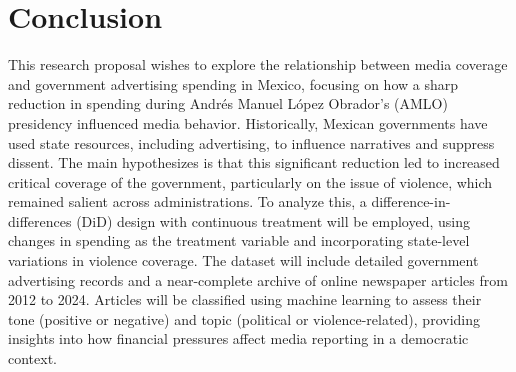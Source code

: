 \section{Conclusion}

This research proposal wishes to explore the relationship between media coverage and government advertising spending in Mexico, focusing on how a sharp reduction in spending during Andrés Manuel López Obrador's (AMLO) presidency influenced media behavior. Historically, Mexican governments have used state resources, including advertising, to influence narratives and suppress dissent. The main hypothesizes is that this significant reduction led to increased critical coverage of the government, particularly on the issue of violence, which remained salient across administrations. To analyze this, a difference-in-differences (DiD) design with continuous treatment will be employed, using changes in spending as the treatment variable and incorporating state-level variations in violence coverage. The dataset will include detailed government advertising records and a near-complete archive of online newspaper articles from 2012 to 2024. Articles will be classified using machine learning to assess their tone (positive or negative) and topic (political or violence-related), providing insights into how financial pressures affect media reporting in a democratic context.